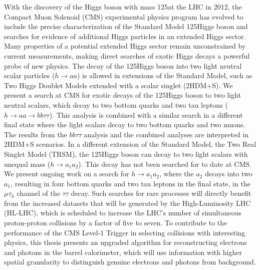 With the discovery of the Higgs boson with mass 125\GeV at the LHC in 2012, the Compact Muon Solenoid (CMS) experimental physics program has evolved to include the precise characterization of the Standard Model 125\GeV Higgs boson and searches for evidence of additional Higgs particles in an extended Higgs sector. Many properties of a potential extended Higgs sector remain unconstrained by current measurements, making direct searches of exotic Higgs decays a powerful probe of new physics. The decay of the 125\GeV Higgs boson into two light neutral scalar particles ($h\rightarrow aa$) is allowed in extensions of the Standard Model, such as Two Higgs Doublet Models extended with a scalar singlet (2HDM+S). We present a search at CMS for exotic decays of the 125\GeV Higgs boson to two light neutral scalars, which decay to two bottom quarks and two tau leptons ($h\rightarrow aa \rightarrow bb\tau\tau$). This analysis is combined with a similar search in a different final state where the light scalars decay to two bottom quarks and two muons. The results from the $bb\tau\tau$ analysis and the combined analyses are interpreted in 2HDM+S scenarios. In a different extension of the Standard Model, the Two Real Singlet Model (TRSM), the 125\GeV Higgs boson can decay to two light scalars with unequal mass ($h \rightarrow a_1 a_2$). This decay has not been searched for to date at CMS. We present ongoing work on a search for $h\rightarrow a_1 a_2$, where the $a_2$ decays into two $a_1$, resulting in four bottom quarks and two tau leptons in the final state, in the $\mu\tau_{h}$ channel of the $\tau\tau$ decay. Such searches for rare processes will directly benefit from the increased datasets that will be generated by the High-Luminosity LHC (HL-LHC), which is scheduled to increase the LHC's number of simultaneous proton-proton collisions by a factor of five to seven. To contribute to the performance of the CMS Level-1 Trigger in selecting collisions with interesting physics, this thesis presents an upgraded algorithm for reconstructing electrons and photons in the barrel calorimeter, which will use information with higher spatial granularity to distinguish genuine electrons and photons from background.